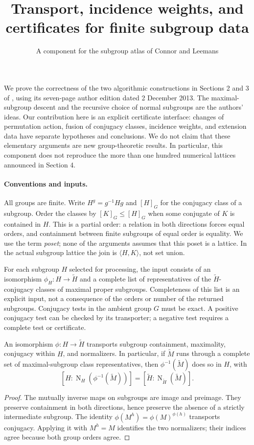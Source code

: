 \documentclass[11pt]{article}
\title{Transport, incidence weights, and certificates for finite subgroup data}
\author{A component for the subgroup atlas of Connor and Leemans}
\date{}
\newcommand{\N}{\operatorname{N}}\newcommand{\Inn}{\operatorname{Inn}}
\begin{document}
\maketitle
\noindent
We prove the correctness of the two algorithmic constructions in Sections 2
and 3 of \cite{CL}, using its seven-page author edition dated 2 December
2013. The maximal-subgroup descent and the recursive choice of normal
subgroups are the authors' ideas. Our contribution here is an explicit
certificate interface: changes of permutation action, fusion of conjugacy
classes, incidence weights, and extension data have separate hypotheses
and conclusions. We do not claim that these elementary arguments are new
group-theoretic results. In particular, this component does not reproduce
the more than one hundred numerical lattices announced in Section 4.

\paragraph{Conventions and inputs.}
All groups are finite. Write $H^g=g^{-1}Hg$ and $[H]_G$ for the conjugacy
class of a subgroup. Order the classes by $[K]_G\leq[H]_G$ when some
conjugate of $K$ is contained in $H$. This is a partial order: a relation
in both directions forces equal orders, and containment between finite
subgroups of equal order is equality. We use the term \emph{poset}; none
of the arguments assumes that this poset is a lattice. In the actual
subgroup lattice the join is $\langle H,K\rangle$, not set union.

For each subgroup $H$ selected for processing, the input consists of an
isomorphism $\phi_H:H\longrightarrow\widetilde H$ and a complete list of
representatives of the $\widetilde H$-conjugacy classes of maximal proper
subgroups. Completeness of this list is an explicit input, not a consequence
of the orders or number of the returned subgroups. Conjugacy tests in the
ambient group $G$ must be exact. A positive conjugacy test can be checked
by its transporter; a negative test requires a complete test or certificate.

\begin{lemma}\label{transport}
An isomorphism $\phi:H\to\widetilde H$ transports subgroup containment,
maximality, conjugacy within $H$, and normalizers. In particular, if
$\widetilde M$ runs through a complete set of maximal-subgroup class
representatives, then $\phi^{-1}(\widetilde M)$ does so in $H$, with
\[
 [H:\N_H(\phi^{-1}(\widetilde M))]
   =[\widetilde H:\N_{\widetilde H}(\widetilde M)].
\]
\end{lemma}
\begin{proof}
The mutually inverse maps on subgroups are image and preimage. They preserve
containment in both directions, hence preserve the absence of a strictly
intermediate subgroup. The identity $\phi(M^h)=\phi(M)^{\phi(h)}$ transports
conjugacy. Applying it with $M^h=M$ identifies the two normalizers; their
indices agree because both group orders agree.
\end{proof}
\end{document}
